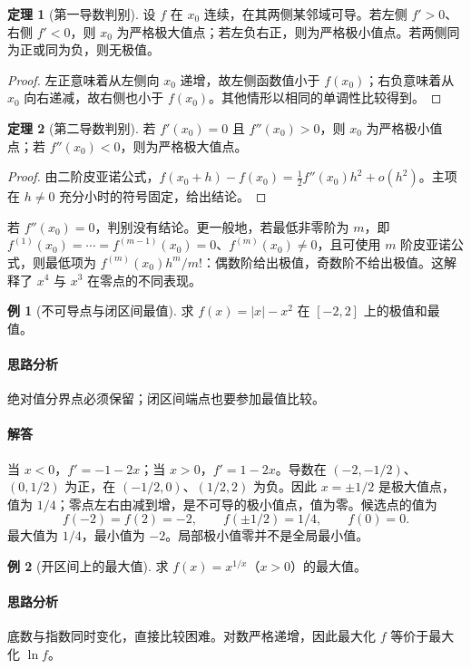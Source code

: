 \documentclass[UTF8,fontset=fandol,12pt,oneside,openany]{ctexrep}
\theoremstyle{definition}
\newtheorem{theorem}{定理}[chapter]
\newtheorem{example}{例}[chapter]
\begin{document}
\begin{theorem}[第一导数判别]
设 $f$ 在 $x_0$ 连续，在其两侧某邻域可导。若左侧 $f'>0$、右侧 $f'<0$，则 $x_0$ 为严格极大值点；若左负右正，则为严格极小值点。若两侧同为正或同为负，则无极值。
\end{theorem}
\begin{proof}
左正意味着从左侧向 $x_0$ 递增，故左侧函数值小于 $f(x_0)$；右负意味着从 $x_0$ 向右递减，故右侧也小于 $f(x_0)$。其他情形以相同的单调性比较得到。
\end{proof}
\begin{theorem}[第二导数判别]
若 $f'(x_0)=0$ 且 $f''(x_0)>0$，则 $x_0$ 为严格极小值点；若 $f''(x_0)<0$，则为严格极大值点。
\end{theorem}
\begin{proof}
由二阶皮亚诺公式，$f(x_0+h)-f(x_0)=\tfrac12f''(x_0)h^2+o(h^2)$。主项在 $h\ne0$ 充分小时的符号固定，给出结论。
\end{proof}
若 $f''(x_0)=0$，判别没有结论。更一般地，若最低非零阶为 $m$，即 $f^{(1)}(x_0)=\cdots=f^{(m-1)}(x_0)=0$、$f^{(m)}(x_0)\ne0$，且可使用 $m$ 阶皮亚诺公式，则最低项为 $f^{(m)}(x_0)h^m/m!$：偶数阶给出极值，奇数阶不给出极值。这解释了 $x^4$ 与 $x^3$ 在零点的不同表现。

\begin{example}[不可导点与闭区间最值]
求 $f(x)=|x|-x^2$ 在 $[-2,2]$ 上的极值和最值。
\end{example}
\paragraph{思路分析}绝对值分界点必须保留；闭区间端点也要参加最值比较。
\paragraph{解答}当 $x<0$，$f'=-1-2x$；当 $x>0$，$f'=1-2x$。导数在 $(-2,-1/2)$、$(0,1/2)$ 为正，在 $(-1/2,0)$、$(1/2,2)$ 为负。因此 $x=\pm1/2$ 是极大值点，值为 $1/4$；零点左右由减到增，是不可导的极小值点，值为零。候选点的值为
\[f(-2)=f(2)=-2,\qquad f(\pm1/2)=1/4,\qquad f(0)=0.\]
最大值为 $1/4$，最小值为 $-2$。局部极小值零并不是全局最小值。

\begin{example}[开区间上的最大值]
求 $f(x)=x^{1/x}$（$x>0$）的最大值。
\end{example}
\paragraph{思路分析}底数与指数同时变化，直接比较困难。对数严格递增，因此最大化 $f$ 等价于最大化 $\ln f$。
\end{document}
